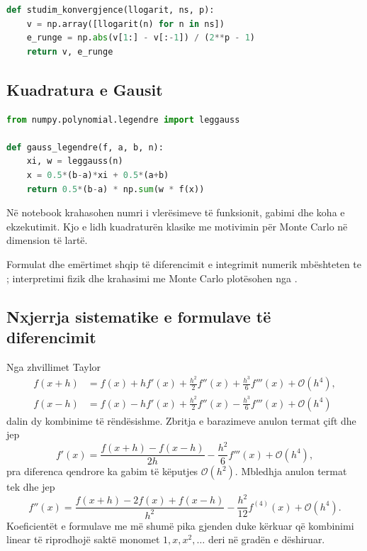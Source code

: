\documentclass[11pt,oneside,openany]{book}
\newcommand{\Oh}{\mathcal{O}}
\begin{document}
\begin{lstlisting}[language=Python]
def studim_konvergjence(llogarit, ns, p):
    v = np.array([llogarit(n) for n in ns])
    e_runge = np.abs(v[1:] - v[:-1]) / (2**p - 1)
    return v, e_runge
\end{lstlisting}

\subsection{Kuadratura e Gausit}
\begin{lstlisting}[language=Python,caption={Gauss--Legendre në një interval të përgjithshëm.}]
from numpy.polynomial.legendre import leggauss

def gauss_legendre(f, a, b, n):
    xi, w = leggauss(n)
    x = 0.5*(b-a)*xi + 0.5*(a+b)
    return 0.5*(b-a) * np.sum(w * f(x))
\end{lstlisting}
Në notebook krahasohen numri i vlerësimeve të funksionit, gabimi dhe koha e ekzekutimit. Kjo e lidh kuadraturën klasike me motivimin për Monte Carlo në dimension të lartë.

Formulat dhe emërtimet shqip të diferencimit e integrimit numerik mbështeten te \cite{hanelli,hoxha,datja}; interpretimi fizik dhe krahasimi me Monte Carlo plotësohen nga \cite{newman,press}.



\subsection{Nxjerrja sistematike e formulave të diferencimit}
Nga zhvillimet Taylor
\begin{align}
 f(x+h)&=f(x)+hf'(x)+\frac{h^2}{2}f''(x)+\frac{h^3}{6}f'''(x)+\Oh(h^4),\\
 f(x-h)&=f(x)-hf'(x)+\frac{h^2}{2}f''(x)-\frac{h^3}{6}f'''(x)+\Oh(h^4)
\end{align}
dalin dy kombinime të rëndësishme. Zbritja e barazimeve anulon termat çift dhe jep
\begin{equation}
 f'(x)=\frac{f(x+h)-f(x-h)}{2h}-\frac{h^2}{6}f'''(x)+\Oh(h^4),
\end{equation}
pra diferenca qendrore ka gabim të këputjes $\Oh(h^2)$. Mbledhja anulon termat tek dhe jep
\begin{equation}
 f''(x)=\frac{f(x+h)-2f(x)+f(x-h)}{h^2}-\frac{h^2}{12}f^{(4)}(x)+\Oh(h^4).
\end{equation}
Koeficientët e formulave me më shumë pika gjenden duke kërkuar që kombinimi linear të riprodhojë saktë monomet $1,x,x^2,\ldots$ deri në gradën e dëshiruar.
\end{document}

